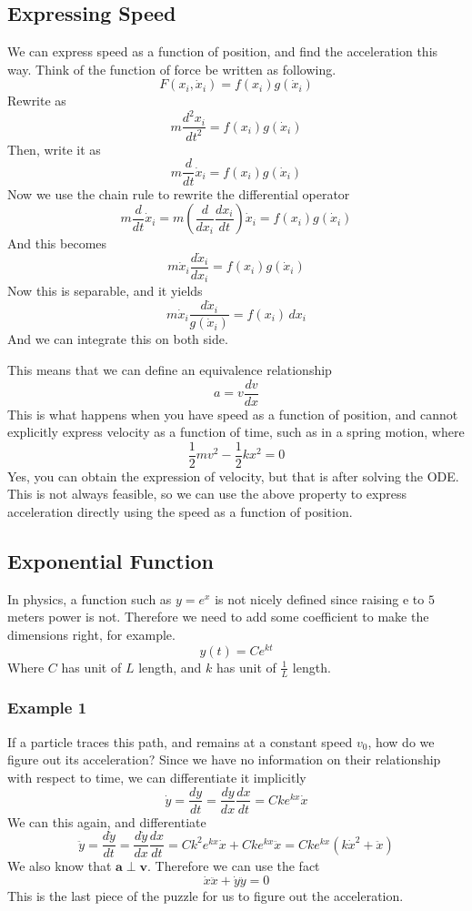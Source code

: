 \documentclass[12pt]{article}
\newcommand{\dydx}[2]{\frac{d #1}{d #2}}
\newcommand{\paren}[1]{\left( #1 \right)}
\begin{document}
\subsection{Expressing Speed}
We can express speed as a function of position, and find the acceleration this way. Think of the function of force be written as following. 
    \[
    F(x_i, \dot{x}_i) = f(x_i) g(\dot{x}_i)
    \]
            Rewrite as
            \[
            m\dydx{^2x_i}{t^2} = f(x_i) g(\dot{x}_i)
            \]
            Then, write it as
            \[
            m\dydx{}{t}\dot{x}_i = f(x_i) g(\dot{x}_i)
            \]
            Now we use the chain rule to rewrite the differential operator
            \[
            m\dydx{}{t}\dot{x}_i  = m\paren{\dydx{}{x_i}\dydx{x_i}{t} }\dot{x}_i= f(x_i) g(\dot{x}_i)
            \]
            And this becomes
            \[
            m\dot{x}_i\dydx{\dot{x}_i}{x_i} = f(x_i) g(\dot{x}_i)
            \]
            Now this is separable, and it yields
            \[
            m\dot{x}_i\frac{d\dot{x}_i}{g(\dot{x}_i)} = f(x_i)\,dx_i
            \]
            And we can integrate this on both side. 

    This means that we can define an equivalence relationship
    \[
    a = v\dydx{v}{x}
    \]
    This is what happens when you have speed as a function of position, and cannot explicitly express velocity as a function of time, such as in a spring motion, where
    \[
    \frac{1}{2}mv^2 - \frac{1}{2}kx^2 = 0
    \]
    Yes, you can obtain the expression of velocity, but that is after solving the ODE. This is not always feasible, so we can use the above property to express acceleration directly using the speed as a function of position. 

\subsection{Exponential Function}
    In physics, a function such as $y = e^{x}$ is not nicely defined since raising e to $5$ meters power is not. Therefore we need to add some coefficient to make the dimensions right, for example.
    \[
    y(t) = Ce^{kt}
    \]
    Where $C$ has unit of $L$ length, and $k$ has unit of $\frac{1}{L}$ length.
    \subsubsection{Example 1}
    If a particle traces this path, and remains at a constant speed $v_0$, how do we figure out its acceleration? Since we have no information on their relationship with respect to time, we can differentiate it implicitly
    \[
    \dot{y} = \dydx{y}{t} = \dydx{y}{x}\dydx{x}{t} = Cke^{kx}\dot{x}
    \]
    We can this again, and differentiate
    \[
    \ddot{y} = \dydx{\dot{y}}{t} = \dydx{\dot{y}}{x}\dydx{x}{t} = Ck^2e^{kx}\dot{x} + Cke^{kx}\ddot{x} = Cke^{kx}\paren{k\dot{x}^2+\ddot{x}}
    \]
    We also know that $\mathbf{a}\perp\mathbf{v}$. Therefore we can use the fact 
    \[
    \dot{x}\ddot{x}+\dot{y}\ddot{y} = 0
    \]
    This is the last piece of the puzzle for us to figure out the acceleration. 
\end{document}

